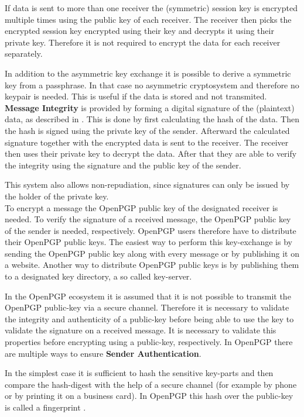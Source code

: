 If data is sent to more than one receiver the (symmetric) session key is encrypted  multiple times using the public key of each receiver. The receiver then picks the encrypted session key encrypted using their key and decrypts it using their private key. Therefore it is not required to encrypt the data for each receiver separately.

In addition to the asymmetric key exchange it is possible to derive a symmetric key from a passphrase. In that case no asymmetric cryptosystem and therefore no keypair is needed. This is useful if the data is stored and not transmited.\\

\textbf{Message Integrity} is provided by forming a digital signature of the (plaintext) data, as described in \cite[section 2.2]{RFC4880}. This is done by first calculating the hash of the data. Then the hash is signed using the private key of the sender. Afterward the calculated signature together with the encrypted data is sent to the receiver. The receiver then uses their private key to decrypt the data. After that they are able to verify the integrity using the signature and the public key of the sender.

This system also allows non-repudiation, since signatures can only be issued by the holder of the private key.\\


To encrypt a message the OpenPGP public key of the designated receiver is needed. To verify the signature of a received message, the OpenPGP public key of the sender is needed, respectively. OpenPGP users therefore have to distribute their OpenPGP public keys. The easiest way to perform this key-exchange is by sending the OpenPGP public key along with every message or by publishing it on a website. Another way to distribute OpenPGP public keys is by publishing them to a designated key directory, a so called key-server.


In the OpenPGP ecosystem it is assumed that it is not possible to transmit the OpenPGP public-key via a secure channel. Therefore it is necessary to validate the integrity and authenticity of a public-key before being able to use the key to validate the signature on a received message. It is necessary to validate this properties before encrypting using a public-key, respectively. In OpenPGP there are multiple ways to ensure \textbf{Sender Authentication}.

In the simplest case it is sufficient to hash the sensitive key-parts and then compare the hash-digest with the help of a secure channel (for example by phone or by printing it on a business card). In OpenPGP this hash over the public-key is called a fingerprint \cite[section 12]{RFC4880}.


